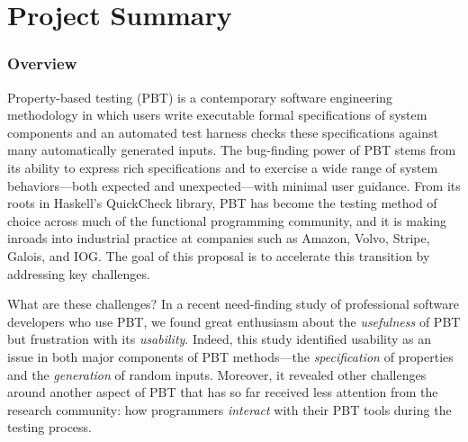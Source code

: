\section*{Project Summary}

\newcommand{\summarysection}[1]{\vspace{-2mm}\subsubsection*{#1}\vspace{-1mm}}


\summarysection{Overview}
Property-based testing (PBT) is a contemporary software engineering
methodology in which users write executable formal specifications of system
components
and an automated test harness checks these specifications against
many automatically generated inputs.  The bug-finding power of PBT
stems from its ability to express rich specifications and to
exercise a wide range of system behaviors---both
expected and unexpected---with minimal user guidance.
%
From its roots in Haskell's QuickCheck library, PBT has become
the testing method of choice across much of the functional programming
community, and it is making inroads into industrial practice
at companies such as Amazon, Volvo, Stripe, Galois, and IOG.
%
The goal of this proposal is to accelerate this transition
by addressing key challenges.

What are these challenges?
In a recent need-finding study of professional software developers who
use PBT, we
found great enthusiasm
about the {\em usefulness} of PBT but frustration with its {\em usability}.
%
Indeed, this study identified usability as an issue in both major components
of PBT methods---the {\em specification} of properties and the {\em
  generation} of random inputs. Moreover, it revealed other challenges
around another aspect of PBT that has so far received less
attention from the research community: how programmers {\em interact}
with their PBT tools during the testing process.


